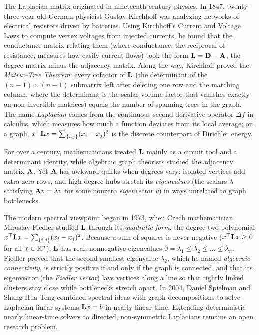 \begin{historybox}
The Laplacian matrix originated in nineteenth-century physics. In 1847, twenty-three-year-old
German physicist Gustav Kirchhoff was analyzing networks of electrical resistors driven by
batteries. Using Kirchhoff's Current and Voltage Laws to compute vertex voltages from injected currents, he found that the conductance matrix relating them (where conductance, the reciprocal of resistance, measures how easily current flows) took the form $\mathbf{L} = \mathbf{D} - \mathbf{A}$, the degree matrix minus the adjacency matrix. Along the way, Kirchhoff proved the
\emph{Matrix--Tree Theorem}: every cofactor of $\mathbf{L}$ (the determinant of the $(n-1)\times(n-1)$ submatrix left after deleting one row and the matching column, where the determinant is the scalar volume factor that vanishes exactly on non-invertible matrices) equals the number of spanning
trees in the graph. The name \emph{Laplacian} comes from the continuous second-derivative operator $\Delta f$ in calculus, which measures how much a function deviates
from its local average; on a graph, $x^\top \mathbf{L} x = \sum_{\{i,j\}}(x_i - x_j)^2$ is the discrete counterpart of Dirichlet energy.

For over a century, mathematicians treated $\mathbf{L}$ mainly as a circuit tool and a determinant identity, while algebraic graph theorists studied the adjacency
matrix $\mathbf{A}$. Yet $\mathbf{A}$ has awkward quirks when degrees vary: isolated vertices add extra zero rows, and high-degree hubs stretch its \emph{eigenvalues} (the scalars $\lambda$ satisfying $\mathbf{A} v = \lambda v$ for some nonzero \emph{eigenvector} $v$) in ways unrelated to graph bottlenecks.

The modern spectral viewpoint began in 1973, when Czech mathematician Miroslav Fiedler studied $\mathbf{L}$ through its \emph{quadratic form}, the degree-two polynomial $x^\top \mathbf{L} x = \sum_{\{i,j\}} (x_i - x_j)^2$. Because a sum of squares is never negative ($x^\top \mathbf{L} x \ge 0$ for all $x \in \mathbb{R}^n$), $\mathbf{L}$ has real, nonnegative eigenvalues $0 = \lambda_1 \le \lambda_2 \le \dots \le \lambda_n$. Fiedler proved that the second-smallest eigenvalue
$\lambda_2$, which he named \emph{algebraic connectivity}, is strictly positive if and only
if the graph is connected, and that its eigenvector (the \emph{Fiedler vector}) lays vertices along a line so that tightly linked clusters stay close while bottlenecks stretch apart. In 2004,
Daniel Spielman and Shang-Hua Teng combined spectral ideas with graph decompositions to solve Laplacian linear systems $\mathbf{L} x = b$ in nearly linear time. Extending deterministic nearly linear-time solvers to directed, non-symmetric Laplacians remains an open research problem.
\end{historybox}

